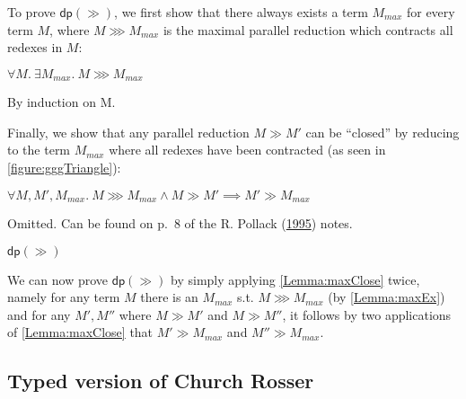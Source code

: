 \documentclass[a4paper, 12pt, twoside]{style/ociamthesis}
\makeatletter
\theoremstyle{plain}
\theoremstyle{definition}
\newtheorem{Lemma}{Lemma}[chapter]
\theoremstyle{remark}
\renewenvironment{proof}[1][\proofname]{\par
  \vspace{-\topsep}%
  \pushQED{\qed}%
  \normalfont
  \topsep0pt \partopsep0pt %
  \trivlist
  \item[\hskip\labelsep
        \itshape
    #1\@addpunct{.}]\ignorespaces
}{%
  \popQED\endtrivlist\@endpefalse
  \addvspace{6pt plus 6pt} %
}
\newcommand{\dip}{\textsf{dp}}
\renewenvironment{Lemma}{\begin{OldLemma}\begin{mdframed}[style=example, linecolor=cyan]}{\end{mdframed}\end{OldLemma}}
\makeatother
\begin{document}
To prove \(\dip(\gg)\), we first show that there always exists a term
\(M_{max}\) for every term \(M\), where \(M \ggg M_{max}\) is the
maximal parallel reduction which contracts all redexes in \(M\):

\begin{Lemma}

\label{Lemma:maxEx} \(\forall M.\ \exists M_{max}.\ M \ggg M_{max}\)

\begin{proof}

By induction on M.

\end{proof}

\end{Lemma}

Finally, we show that any parallel reduction \(M \gg M'\) can be
``closed'' by reducing to the term \(M_{max}\) where all redexes have
been contracted (as seen in \cref{figure:gggTriangle}):

\begin{Lemma}

\label{Lemma:maxClose}
\(\forall M, M', M_{max}.\ M \ggg M_{max} \land M \gg M' \implies M' \gg M_{max}\)

\begin{proof}

Omitted. Can be found on p.~8 of the R. Pollack
(\protect\hyperlink{ref-pollack95}{1995}) notes.

\end{proof}

\end{Lemma}

\begin{Lemma}

\(\dip(\gg)\)

\begin{proof}

We can now prove \(\dip(\gg)\) by simply applying \cref{Lemma:maxClose}
twice, namely for any term \(M\) there is an \(M_{max}\) s.t.
\(M \ggg M_{max}\) (by \cref{Lemma:maxEx}) and for any \(M', M''\) where
\(M \gg M'\) and \(M \gg M''\), it follows by two applications of
\cref{Lemma:maxClose} that \(M' \gg M_{max}\) and \(M'' \gg M_{max}\).

\end{proof}

\end{Lemma}

\subsection{Typed version of Church
Rosser}\label{typed-version-of-church-rosser}
\end{document}
